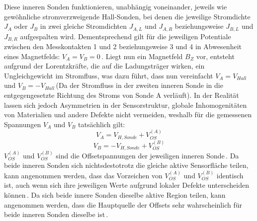 \documentclass[12pt, a4paper]{article}
\begin{document}
\newline
Diese inneren Sonden funktionieren, unabhängig voneinander, jeweils wie gewöhnliche stromverzweigende Hall-Sonden, bei denen die jeweilige Stromdichte $J_A$ oder $J_B$ in zwei gleiche Stromdichten $J_{A,L}$ und $J_{A,R}$ beziehungsweise $J_{B,L}$ und $J_{B,R}$ aufgespalten wird. Dementsprechend gilt für die jeweiligen Potentiale zwischen den Messkontakten 1 und 2 beziehungsweise 3 und 4 in Abwesenheit eines Magnetfelds: $V_A=V_B=0$\,\cite{cres21}.\newline
Liegt nun ein Magnetfeld $B_Z$ vor, entsteht aufgrund der Lorentzkräfte, die auf die Ladungsträger wirken, ein Ungleichgewicht im Stromfluss, was dazu führt, dass nun vereinfacht $V_A=V_{Hall}$ und $V_B=-V_{Hall}$\,(Da der Stromfluss in der zweiten inneren Sonde in die entgegengesetzte Richtung des Stroms von Sonde A verläuft).\newline
In der Realität lassen sich jedoch Asymmetrien in der Sensorstruktur, globale Inhomogenitäten von Materialien und andere Defekte nicht vermeiden, weshalb für die gemessenen Spannungen $V_A$ und $V_B$ tatsächlich gilt:
\begin{equation}
	V_A=V_{H,Sonde}+V_{OS}^{(A)}
	\label{eq:1}
\end{equation}
\begin{equation}
	V_B=-V_{H,Sonde}+V_{OS}^{(B)}
	\label{eq:2}
\end{equation}
$V_{OS}^{(A)}$ und $V_{OS}^{(B)}$ sind die Offsetspannungen der jeweiligen inneren Sonde\,\cite{cres20}.\newline
Da beide inneren Sonden sich nichtsdestotrotz die gleiche aktive Sensorfläche teilen, kann angenommen werden, dass das Vorzeichen von $V_{OS}^{(A)}$ und $V_{OS}^{(B)}$ identisch ist, auch wenn sich ihre jeweiligen Werte aufgrund lokaler Defekte unterscheiden können\,\cite{cres21}. Da sich beide innere Sonden dieselbe aktive Region teilen, kann angenommen werden, dass die Hauptquelle der Offsets sehr wahrscheinlich für beide inneren Sonden dieselbe ist\,\cite{cres20}.\newline
\end{document}
